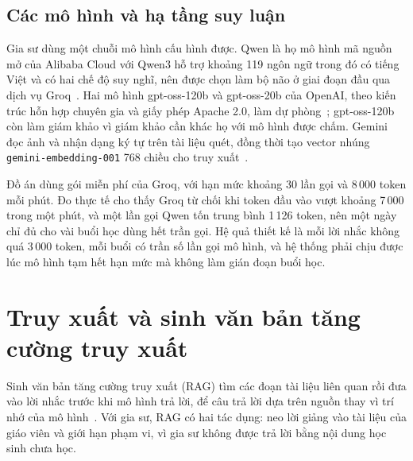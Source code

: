 \subsection{Các mô hình và hạ tầng suy luận}
Gia sư dùng một chuỗi mô hình cấu hình được. Qwen là họ mô hình mã nguồn mở của Alibaba Cloud với Qwen3 hỗ trợ khoảng 119 ngôn ngữ trong đó có tiếng Việt và có hai chế độ suy nghĩ, nên được chọn làm bộ não ở giai đoạn đầu qua dịch vụ Groq~\cite{qwen3,groqdocs}. Hai mô hình gpt-oss-120b và gpt-oss-20b của OpenAI, theo kiến trúc hỗn hợp chuyên gia và giấy phép Apache 2.0, làm dự phòng~\cite{gptoss2025}; gpt-oss-120b còn làm giám khảo vì giám khảo cần khác họ với mô hình được chấm. Gemini đọc ảnh và nhận dạng ký tự trên tài liệu quét, đồng thời tạo vector nhúng \texttt{gemini-embedding-001} 768 chiều cho truy xuất~\cite{gemini2023}.

Đồ án dùng gói miễn phí của Groq, với hạn mức khoảng 30 lần gọi và 8\,000 token mỗi phút. Đo thực tế cho thấy Groq từ chối khi token đầu vào vượt khoảng 7\,000 trong một phút, và một lần gọi Qwen tốn trung bình 1\,126 token, nên một ngày chỉ đủ cho vài buổi học dùng hết trần gọi. Hệ quả thiết kế là mỗi lời nhắc không quá 3\,000 token, mỗi buổi có trần số lần gọi mô hình, và hệ thống phải chịu được lúc mô hình tạm hết hạn mức mà không làm gián đoạn buổi học.

\section{Truy xuất và sinh văn bản tăng cường truy xuất}\label{sec:rag-theory}
Sinh văn bản tăng cường truy xuất (RAG) tìm các đoạn tài liệu liên quan rồi đưa vào lời nhắc trước khi mô hình trả lời, để câu trả lời dựa trên nguồn thay vì trí nhớ của mô hình~\cite{lewis2020,gao2023survey}. Với gia sư, RAG có hai tác dụng: neo lời giảng vào tài liệu của giáo viên và giới hạn phạm vi, vì gia sư không được trả lời bằng nội dung học sinh chưa học.

